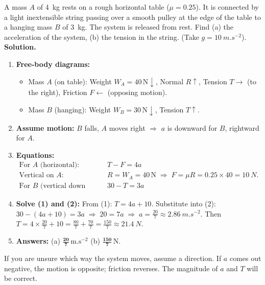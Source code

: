 \documentclass[11pt]{article}
\begin{document}
\begin{exoresolu}
A mass $A$ of \SI{4}{kg} rests on a rough horizontal table ($\mu = 0.25$). It is connected by a light inextensible string passing over a smooth pulley at the edge of the table to a hanging mass $B$ of \SI{3}{kg}. The system is released from rest. Find (a) the acceleration of the system, (b) the tension in the string. (Take $g = \SI{10}{m.s^{-2}}$).
\tcblower
\textbf{Solution.}
\begin{enumerate}
    \item \textbf{Free-body diagrams:}
    \begin{itemize}
        \item Mass $A$ (on table): Weight $W_A=40\,\mathrm{N}\downarrow$, Normal $R\uparrow$, Tension $T\rightarrow$ (to the right), Friction $F\leftarrow$ (opposing motion).
        \item Mass $B$ (hanging): Weight $W_B=30\,\mathrm{N}\downarrow$, Tension $T\uparrow$.
    \end{itemize}
    \item \textbf{Assume motion:} $B$ falls, $A$ moves right $\Rightarrow$ $a$ is downward for $B$, rightward for $A$.
    \item \textbf{Equations:}
    \begin{align*}
    \text{For } A \text{ (horizontal):} &\quad T - F = 4a \tag{1} \\
    \text{Vertical on } A: &\quad R = W_A = 40\,\mathrm{N} \;\Rightarrow\; F = \mu R = 0.25 \times 40 = \SI{10}{N}. \\
    \text{For } B \text{ (vertical down positive):} &\quad 30 - T = 3a \tag{2}
    \end{align*}
    \item \textbf{Solve (1) and (2):}
    From (1): $T = 4a + 10$.
    Substitute into (2): $30 - (4a + 10) = 3a \;\Rightarrow\; 20 = 7a \;\Rightarrow\; a = \frac{20}{7} \approx \SI{2.86}{m.s^{-2}}$.
    Then $T = 4 \times \frac{20}{7} + 10 = \frac{80}{7} + \frac{70}{7} = \frac{150}{7} \approx \SI{21.4}{N}$.
    \item \textbf{Answers:} (a) $\boldsymbol{\frac{20}{7}\,\mathrm{m.s^{-2}}}$ (b) $\boldsymbol{\frac{150}{7}\,\mathrm{N}}$.
\end{enumerate}
\begin{attention}
If you are unsure which way the system moves, assume a direction. If $a$ comes out negative, the motion is opposite; friction reverses. The magnitude of $a$ and $T$ will be correct.
\end{attention}
\end{exoresolu}
\end{document}
